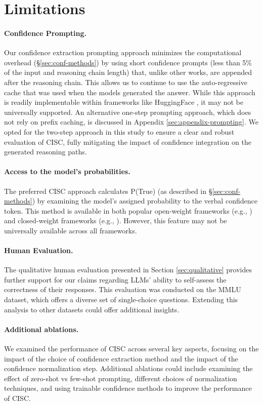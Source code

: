 \clearpage
\newpage
\section{Limitations}

\paragraph{Confidence Prompting. } Our confidence extraction prompting approach minimizes the computational overhead (\S\ref{sec:conf-methods}) by using short confidence prompts (less than 5\% of the input and reasoning chain length) that, unlike other works, are appended after the reasoning chain. This allows us to continue to use the auto-regressive cache that was used when the models generated the answer. While this approach is readily implementable within frameworks like HuggingFace \cite{hf}, it may not be universally supported. An alternative one-step prompting approach, which does not rely on prefix caching, is discussed in Appendix \ref{sec:appendix-prompting}.  We opted for the two-step approach in this study to ensure a clear and robust evaluation of CISC, fully mitigating the impact of confidence integration on the generated reasoning paths.

\paragraph{Access to the model's probabilities. } The preferred CISC approach calculates P(True) (as described in \S\ref{sec:conf-methods}) by examining the model's assigned probability to the verbal confidence token.  This method is available in both popular open-weight frameworks (e.g., \citet{hf}) and closed-weight frameworks (e.g., \citet{openaiapi}).  However, this feature may not be universally available across all frameworks.

\paragraph{Human Evaluation. }  The qualitative human evaluation presented in Section \ref{sec:qualitative} provides further support for our claims regarding LLMs' ability to self-assess the correctness of their responses. This evaluation was conducted on the MMLU dataset, which offers a diverse set of single-choice questions.  Extending this analysis to other datasets could offer additional insights.

\paragraph{Additional ablations. } We examined the performance of CISC across several key aspects, focusing on the impact of the choice of confidence extraction method and the impact of the confidence normalization step. Additional ablations could include examining the effect of zero-shot vs few-shot prompting, different choices of normalization techniques, and using trainable confidence methods \cite{lin2022teaching, chaudhry2024finetuning} to improve the performance of CISC.

